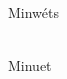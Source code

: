 \begin{multicols}{2}
    \Huge{Minwéts}\\
    \vspace{1cm}\\
    \normalsize{
      \noindent 
      \blindtext
    }

    \newcolumn

    \Huge{Minuet}\\
    \vspace{1cm}\\
    \normalsize{
      \noindent
      \blindtext
    }

    \end{multicols}